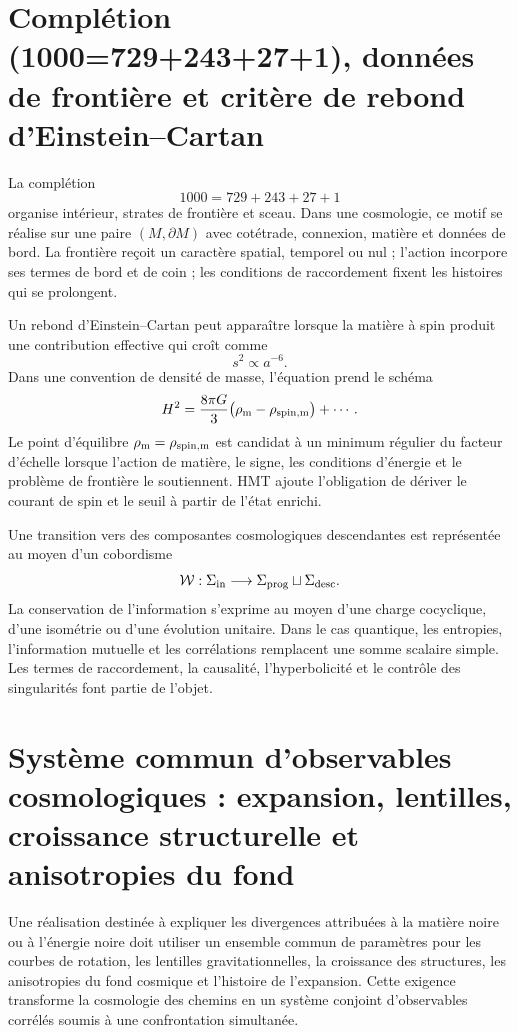 \section{Complétion (1000=729+243+27+1), données de frontière et critère de rebond d'Einstein–Cartan}

La complétion
\[
 1000=729+243+27+1
\]
organise intérieur, strates de frontière et sceau. Dans une cosmologie, ce
motif se réalise sur une paire \((M,\partial M)\) avec cotétrade, connexion,
matière et données de bord. La frontière reçoit un caractère spatial, temporel ou
nul ; l'action incorpore ses termes de bord et de coin ; les conditions de
raccordement fixent les histoires qui se prolongent.

Un rebond d'Einstein--Cartan peut apparaître lorsque la matière à spin
produit une contribution effective qui croît comme
\[
 s^2\propto a^{-6}.
\]
Dans une convention de densité de masse, l'équation prend le schéma
\[
 H^2=\frac{8\pi G}{3}
 \bigl(\rho_{\rm m}-\rho_{\rm spin,m}\bigr)+\cdots.
\]
Le point d'équilibre
\(\rho_{\rm m}=\rho_{\rm spin,m}\) est candidat à un minimum régulier du
facteur d'échelle lorsque l'action de matière, le signe, les conditions
d'énergie et le problème de frontière le soutiennent. HMT ajoute l'obligation de
dériver le courant de spin et le seuil à partir de l'état enrichi.

Une transition vers des composantes cosmologiques descendantes est représentée
au moyen d'un cobordisme
\[
 \mathcal W:
 \Sigma_{\rm in}\longrightarrow
 \Sigma_{\rm prog}\sqcup\Sigma_{\rm desc}.
\]
La conservation de l'information s'exprime au moyen d'une charge cocyclique, d'une
isométrie ou d'une évolution unitaire. Dans le cas quantique, les entropies,
l'information mutuelle et les corrélations remplacent une somme scalaire simple.
Les termes de raccordement, la causalité, l'hyperbolicité et le contrôle des
singularités font partie de l'objet.

\section{Système commun d'observables cosmologiques : expansion, lentilles, croissance structurelle et anisotropies du fond}

Une réalisation destinée à expliquer les divergences attribuées à la matière
noire ou à l'énergie noire doit utiliser un ensemble commun de paramètres pour
les courbes de rotation, les lentilles gravitationnelles, la croissance des structures,
les anisotropies du fond cosmique et l'histoire de l'expansion. Cette exigence
transforme la cosmologie des chemins en un système conjoint d'observables
corrélés soumis à une confrontation simultanée.


